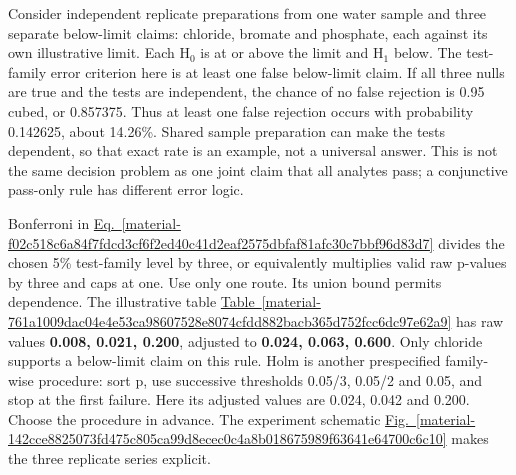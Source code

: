 \documentclass[11pt,a4paper]{article}
\begin{document}
Consider independent replicate preparations from one water sample and three separate below-limit claims: chloride, bromate and phosphate, each against its own illustrative limit. Each H\ensuremath{{}_0} is at or above the limit and H\ensuremath{{}_1} below. The test-family error criterion here is at least one false below-limit claim. If all three nulls are true and the tests are independent, the chance of no false rejection is 0.95 cubed, or 0.857375. Thus at least one false rejection occurs with probability 0.142625, about 14.26\%. Shared sample preparation can make the tests dependent, so that exact rate is an example, not a universal answer. This is not the same decision problem as one joint claim that all analytes pass; a conjunctive pass-only rule has different error logic.


Bonferroni in \hyperref[material-f02c518c6a84f7fdcd3cf6f2ed40c41d2eaf2575dbfaf81afc30c7bbf96d83d7]{Eq.~\ref*{material-f02c518c6a84f7fdcd3cf6f2ed40c41d2eaf2575dbfaf81afc30c7bbf96d83d7}} divides the chosen 5\% test-family level by three, or equivalently multiplies valid raw p-values by three and caps at one. Use only one route. Its union bound permits dependence. The illustrative table \hyperref[material-761a1009dac04e4e53ca98607528e8074cfdd882bacb365d752fcc6dc97e62a9]{Table~\ref*{material-761a1009dac04e4e53ca98607528e8074cfdd882bacb365d752fcc6dc97e62a9}} has raw values \textbf{0.008, 0.021, 0.200}, adjusted to \textbf{0.024, 0.063, 0.600}. Only chloride supports a below-limit claim on this rule. Holm is another prespecified family-wise procedure: sort p, use successive thresholds 0.05/3, 0.05/2 and 0.05, and stop at the first failure. Here its adjusted values are 0.024, 0.042 and 0.200. Choose the procedure in advance. The experiment schematic \hyperref[material-142cce8825073fd475c805ca99d8ecec0c4a8b018675989f63641e64700c6c10]{Fig.~\ref*{material-142cce8825073fd475c805ca99d8ecec0c4a8b018675989f63641e64700c6c10}} makes the three replicate series explicit.
\end{document}

